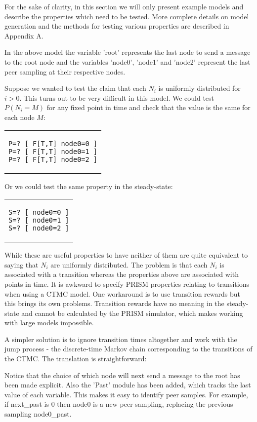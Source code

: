 \documentclass[a4paper,10pt]{article}
\newcommand{\code}[1]{
  \footnotesize
  
}
\newcommand{\prismmodel}[1]{
  \begin{quotation}
  \code{../models/#1.sm}
  \end{quotation}
}
\newenvironment{prismprop}[0]{
  \begin{center}
  \begin{tabular}{c}
  \footnotesize
}{
  \end{tabular}
  \end{center}
}
\begin{document}
\prismmodel{ctmc_single}

For the sake of clarity, in this section we will only present example models and describe the properties which need to be tested. More complete details on model generation and the methods for testing various properties are described in Appendix A.

In the above model the variable 'root' represents the last node to send a message to the root node and the variables 'node0', 'node1' and 'node2' represent the last peer sampling at their respective nodes.

Suppose we wanted to test the claim that each $N_i$ is uniformly distributed for $i>0$. This turns out to be very difficult in this model. We could test $P(N_i = M)$ for any fixed point in time and check that the value is the same for each node $M$:

\begin{prismprop}
\begin{lstlisting}
P=? [ F[T,T] node0=0 ]
P=? [ F[T,T] node0=1 ]
P=? [ F[T,T] node0=2 ]
\end{lstlisting}
\end{prismprop}

Or we could test the same property in the steady-state:

\begin{prismprop}
\begin{lstlisting}
S=? [ node0=0 ]
S=? [ node0=1 ]
S=? [ node0=2 ]
\end{lstlisting}
\end{prismprop}

While these are useful properties to have neither of them are quite equivalent to saying that $N_i$ are uniformly distributed. The problem is that each $N_i$ is associated with a transition whereas the properties above are associated with points in time. It is awkward to specify PRISM properties relating to transitions when using a CTMC model. One workaround is to use transition rewards but this brings its own problems. Transition rewards have no meaning in the steady-state and cannot be calculated by the PRISM simulator, which makes working with large models impossible.

A simpler solution is to ignore transition times altogether and work with the jump process - the discrete-time Markov chain corresponding to the transitions of the CTMC. The translation is straightforward:

\prismmodel{dtmc_single}

Notice that the choice of which node will next send a message to the root has been made explicit. Also the 'Past' module has been added, which tracks the last value of each variable. This makes it easy to identify peer samples. For example, if next\_past is 0 then node0 is a new peer sampling, replacing the previous sampling node0\_past.
\end{document}
